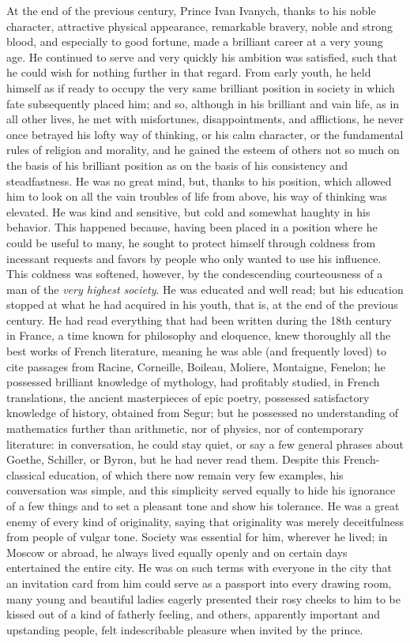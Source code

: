 At the end of the previous century, Prince Ivan Ivanych, thanks to his noble character, attractive physical appearance, remarkable bravery, noble and strong blood, and especially to good fortune, made a brilliant career at a very young age. He continued to serve and very quickly his ambition was satisfied, such that he could wish for nothing further in that regard. From early youth, he held himself as if ready to occupy the very same brilliant position in society in which fate subsequently placed him; and so, although in his brilliant and vain life, as in all other lives, he met with misfortunes, disappointments, and afflictions, he never once betrayed his lofty way of thinking, or his calm character, or the fundamental rules of religion and morality, and he gained the esteem of others not so much on the basis of his brilliant position as on the basis of his consistency and steadfastness. He was no great mind, but, thanks to his position, which allowed him to look on all the vain troubles of life from above, his way of thinking was elevated. He was kind and sensitive, but cold and somewhat haughty in his behavior. This happened because, having been placed in a position where he could be useful to many, he sought to protect himself through coldness from incessant requests and favors by people who only wanted to use his influence. This coldness was softened, however, by the condescending courteousness of a man of the \emph{very highest society}. He was educated and well read; but his education stopped at what he had acquired in his youth, that is, at the end of the previous century. He had read everything that had been written during the 18th century in France, a time known for philosophy and eloquence, knew thoroughly all the best works of French literature, meaning he was able (and frequently loved) to cite passages from Racine, Corneille, Boileau, Moliere, Montaigne, Fenelon; he possessed brilliant knowledge of mythology, had profitably studied, in French translations, the ancient masterpieces of epic poetry, possessed satisfactory knowledge of history, obtained from Segur; but he possessed no understanding of mathematics further than arithmetic, nor of physics, nor of contemporary literature: in conversation, he could stay quiet, or say a few general phrases about Goethe, Schiller, or Byron, but he had never read them. Despite this French-classical education, of which there now remain very few examples, his conversation was simple, and this simplicity served equally to hide his ignorance of a few things and to set a pleasant tone and show his tolerance. He was a great enemy of every kind of originality, saying that originality was merely deceitfulness from people of vulgar tone. Society was essential for him, wherever he lived; in Moscow or abroad, he always lived equally openly and on certain days entertained the entire city. He was on such terms with everyone in the city that an invitation card from him could serve as a passport into every drawing room, many young and beautiful ladies eagerly presented their rosy cheeks to him to be kissed out of a kind of fatherly feeling, and others, apparently important and upstanding people, felt indescribable pleasure when invited by the prince.

